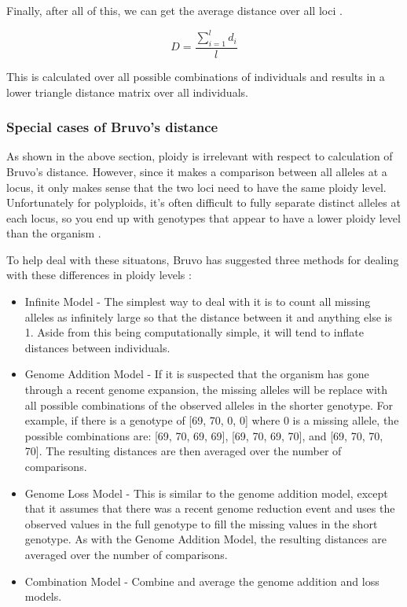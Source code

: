 \documentclass[letterpaper]{article}\usepackage[]{graphicx}\usepackage[]{color}
\begin{document}
Finally, after all of this, we can get the average distance over all loci
\cite{Bruvo:2004}.

\begin{equation}
\label{eq:D}
D = \frac{\displaystyle \sum_{i=1}^l d_i}{l}
\end{equation}

This is calculated over all possible combinations of individuals and results in
a lower triangle distance matrix over all individuals.

\subsubsection{Special cases of Bruvo's distance}
\label{appendix:algorithm:bruvospecial}
As shown in the above section, ploidy is irrelevant with respect to
calculation of Bruvo's distance. However, since it makes a comparison between
all alleles at a locus, it only makes sense that the two loci need to have the
same ploidy level. Unfortunately for polyploids, it's often difficult to fully
separate distinct alleles at each locus, so you end up with genotypes that
appear to have a lower ploidy level than the organism \cite{Bruvo:2004}.

To help deal with these situatons, Bruvo has suggested three methods for dealing
with these differences in ploidy levels \cite{Bruvo:2004}:
\begin{itemize}
  \item{Infinite Model -} The simplest way to deal with it is to count all
  missing alleles as infinitely large so that the distance between it and
  anything else is 1. Aside from this being computationally simple, it will tend
  to inflate distances between individuals.
  \item{Genome Addition Model -} If it is suspected that the organism has gone
  through a recent genome expansion, the missing alleles will be replace with
  all possible combinations of the observed alleles in the shorter genotype. For
  example, if there is a genotype of [69, 70, 0, 0] where 0 is a missing allele,
  the possible combinations are: [69, 70, 69, 69], [69, 70, 69, 70], and [69,
  70, 70, 70]. The resulting distances are then averaged over the number of
  comparisons.
  \item{Genome Loss Model -} This is similar to the genome addition model,
  except that it assumes that there was a recent genome reduction event and uses
  the observed values in the full genotype to fill the missing values in the
  short genotype. As with the Genome Addition Model, the resulting distances are
  averaged over the number of comparisons.
  \item{Combination Model -} Combine and average the genome addition and loss
  models.
\end{itemize}
\end{document}
